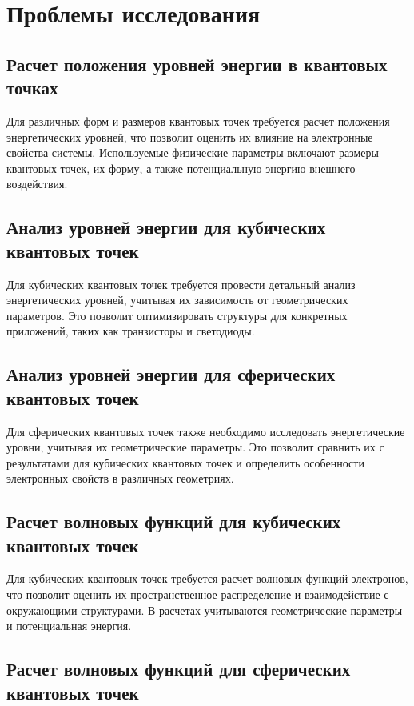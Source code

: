 \documentclass[a4paper,14pt]{extarticle}
\begin{document}
\section*{Проблемы исследования}

\subsection*{Расчет положения уровней энергии в квантовых точках}

Для различных форм и размеров квантовых точек требуется расчет положения энергетических уровней, что позволит оценить их влияние на электронные свойства системы. Используемые физические параметры включают размеры квантовых точек, их форму, а также потенциальную энергию внешнего воздействия.

\subsection*{Анализ уровней энергии для кубических квантовых точек}

Для кубических квантовых точек требуется провести детальный анализ энергетических уровней, учитывая их зависимость от геометрических параметров. Это позволит оптимизировать структуры для конкретных приложений, таких как транзисторы и светодиоды.

\subsection*{Анализ уровней энергии для сферических квантовых точек}

Для сферических квантовых точек также необходимо исследовать энергетические уровни, учитывая их геометрические параметры. Это позволит сравнить их с результатами для кубических квантовых точек и определить особенности электронных свойств в различных геометриях.

\subsection*{Расчет волновых функций для кубических квантовых точек}

Для кубических квантовых точек требуется расчет волновых функций электронов, что позволит оценить их пространственное распределение и взаимодействие с окружающими структурами. В расчетах учитываются геометрические параметры и потенциальная энергия.

\subsection*{Расчет волновых функций для сферических квантовых точек}
\end{document}

